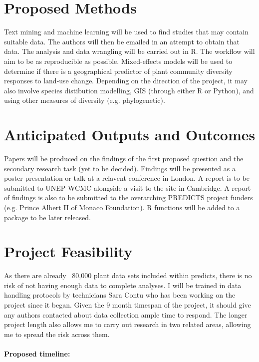 \documentclass[11pt]{article}
\begin{document}
\section{Proposed Methods}
Text mining and machine learning will be used to find studies that may contain suitable data. The authors will then be emailed in an attempt to obtain that data.
The analysis and data wrangling will be carried out in R. The workflow will aim to be as reproducible as possible. 
Mixed-effects models will be used to determine if there is a geographical predictor of plant community diversity responses to land-use change. 
Depending on the direction of the project, it may also involve species distibution modelling, GIS (through either R or Python), and using other measures of diversity (e.g. phylogenetic). 


\section{Anticipated Outputs and Outcomes}
Papers will be produced on the findings of the first proposed question and the secondary research task (yet to be decided). Findings will be presented as a poster presentation or talk at a relavent conference in London. A report is to be submitted to UNEP WCMC alongside a visit to the site in Cambridge. A report of findings is also to be submitted to the overarching PREDICTS project funders (e.g. Prince Albert II of Monaco Foundation). R functions will be added to a package to be later released.

\section{Project Feasibility}
As there are already ~80,000 plant data sets included within predicts, there is no risk of not having enough data to complete analyses. I will be trained in data handling protocols by technicians Sara Contu who has been working on the project since it began. Given the 9 month timespan of the project, it should give any authors contacted about data collection ample time to respond. The longer project length also allows me to carry out research in two related areas, allowing me to spread the risk across them.\\\\
                  \textbf{Proposed timeline:}\\
\end{document}
